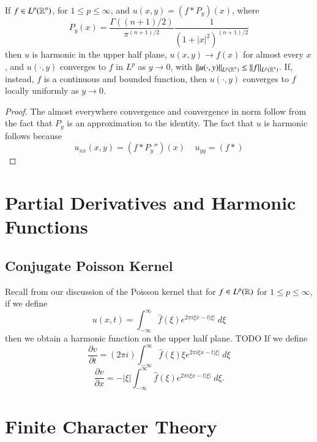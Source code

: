 \begin{theorem}
    If $f \in L^p(\operatorname{\mathbb{R}}^n)$, for $1 \leq p \leq \infty$, and $u(x,y) = (f * P_y)(x)$, where
    \[ P_y(x) = \frac{\Gamma((n+1)/2)}{\pi^{(n+1)/2}} \frac{1}{(1 + |x|^2)^{(n+1)/2}} \]
    then $u$ is harmonic in the upper half plane, $u(x,y) \to f(x)$ for almost every $x$, and $u(\cdot,y)$ converges to $f$ in $L^p$ as $y \to 0$, with $\| u(\cdot,y) \|_{L^p(\operatorname{\mathbb{R}}^n)} \leq \| f \|_{L^p(\operatorname{\mathbb{R}}^n)}$. If, instead, $f$ is a continuous and bounded function, then $u(\cdot,y)$ converges to $f$ locally uniformly as $y \to 0$.
\end{theorem}
\begin{proof}
    The almost everywhere convergence and convergence in norm follow from the fact that $P_y$ is an approximation to the identity. The fact that $u$ is harmonic follows because
    \[ u_{xx}(x,y) = (f * P_y'')(x)\ \ \ \ \ u_{yy} = (f * ) \]
\end{proof}









\chapter{Partial Derivatives and Harmonic Functions}

\section{Conjugate Poisson Kernel}

Recall from our discussion of the Poisson kernel that for $f \in L^p(\operatorname{\mathbb{R}})$ for $1 \leq p \leq \infty$, if we define
%
\[ u(x,t) = \int_{-\infty}^\infty \widehat{f}(\xi) e^{2 \pi i \xi x - t |\xi|}\; d\xi \]
%
then we obtain a harmonic function on the upper half plane. TODO If we define
%
\[ \frac{\partial v}{\partial t} = (2 \pi i) \int_{-\infty}^\infty \widehat{f}(\xi) \xi e^{2 \pi i \xi x - t |\xi|}\; d\xi \]
\[ \frac{\partial v}{\partial x} = - |\xi| \int_{-\infty}^\infty \widehat{f}(\xi) e^{2 \pi i \xi x - t |\xi|}\; d\xi. \]










\chapter{Finite Character Theory}

